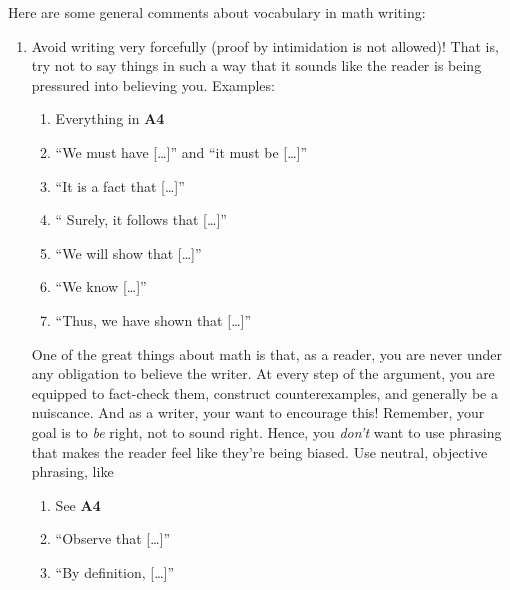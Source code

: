 \documentclass{fkpset}
\begin{document}
\begin{problem}[A9]
  Here are some general comments about vocabulary in math writing:
  \begin{enumerate}
    \item Avoid writing very forcefully (proof by intimidation is not allowed)!
      That is, try not to say things in such a way that it sounds like the
      reader is being pressured into believing you. Examples:\vspace{.5em}
      \begin{enumerate}[label=\roman*)]
        \item Everything in \textbf{A4}\vspace{.5em}
        \item ``We {\color{red}must} have [\ldots]'' and ``it {\color{red}must}
          be [\ldots]''\vspace{.5em}
        \item ``It is a {\color{red} fact} that [\ldots]''\vspace{.5em}
        \item ``{\color{red} Surely}, it follows that [\ldots]''\vspace{.5em}
        \item ``We {\color{red} will} show that [\ldots]''\vspace{.5em}
        \item ``We {\color{red}know} [\ldots]''\vspace{.5em}
        \item ``Thus, {\color{red} we have shown that} [\ldots]''\vspace{.5em}
      \end{enumerate}
      One of the great things about math is that, as a reader, you are never
      under any obligation to believe the writer. At every step of the argument,
      you are equipped to fact-check them, construct counterexamples, and
      generally be a nuiscance. And as a writer, your want to encourage this!
      Remember, your goal is to \emph{be} right, not to sound right. Hence, you
      \emph{don't} want to use phrasing that makes the reader feel like they're
      being biased. Use neutral, objective phrasing, like
      \begin{enumerate}[label=\roman*)]
        \item See \textbf{A4}
        \item ``{\color{blue}Observe that} [\ldots]''\vspace{.5em}
        \item ``{\color{blue}By definition}, [\ldots]''\vspace{.5em}

\end{enumerate}
\end{enumerate}
\end{problem}
\end{document}

